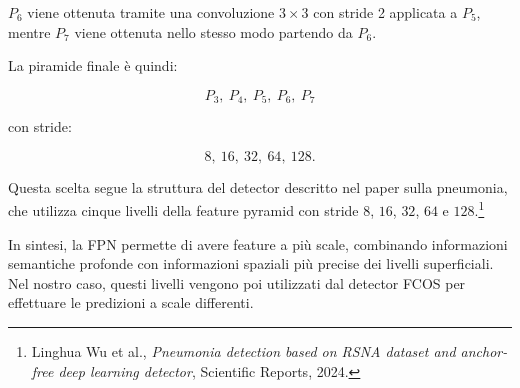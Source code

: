 $P_6$ viene ottenuta tramite una convoluzione $3\times3$ con stride 2 applicata
a $P_5$, mentre $P_7$ viene ottenuta nello stesso modo partendo da $P_6$.

La piramide finale è quindi:

\[
P_3,\ P_4,\ P_5,\ P_6,\ P_7
\]

con stride:

\[
8,\ 16,\ 32,\ 64,\ 128.
\]

Questa scelta segue la struttura del detector descritto nel paper sulla
pneumonia, che utilizza cinque livelli della feature pyramid con stride
$8$, $16$, $32$, $64$ e $128$.\footnote{Linghua Wu et al.,
\textit{Pneumonia detection based on RSNA dataset and anchor-free deep
learning detector}, Scientific Reports, 2024.}

In sintesi, la FPN permette di avere feature a più scale, combinando
informazioni semantiche profonde con informazioni spaziali più precise dei
livelli superficiali. Nel nostro caso, questi livelli vengono poi utilizzati
dal detector FCOS per effettuare le predizioni a scale differenti.
